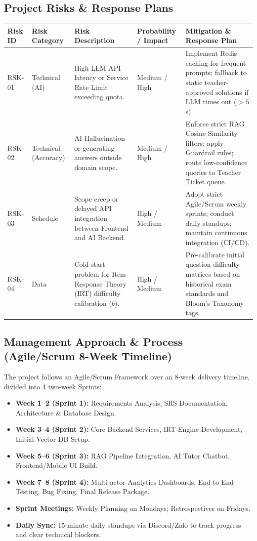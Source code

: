 \documentclass[12pt,a4paper]{article}
\begin{document}
\subsection{Project Risks \& Response Plans}
\begin{table}[H]
\centering
\small
\renewcommand{\arraystretch}{1.3}
\begin{tabularx}{\textwidth}{p{1.4cm} p{2.2cm} X p{2.0cm} X}
\toprule
\textbf{Risk ID} & \textbf{Risk Category} & \textbf{Risk Description} & \textbf{Probability / Impact} & \textbf{Mitigation \& Response Plan} \\
\midrule
RSK-01 & Technical (AI) & High LLM API latency or Service Rate Limit exceeding quota. & Medium / High & Implement Redis caching for frequent prompts; fallback to static teacher-approved solutions if LLM times out ($> 5$s). \\
\addlinespace[0.3em]
RSK-02 & Technical (Accuracy) & AI Hallucination or generating answers outside domain scope. & Medium / High & Enforce strict RAG Cosine Similarity filters; apply Guardrail rules; route low-confidence queries to Teacher Ticket queue. \\
\addlinespace[0.3em]
RSK-03 & Schedule & Scope creep or delayed API integration between Frontend and AI Backend. & High / Medium & Adopt strict Agile/Scrum weekly sprints; conduct daily standups; maintain continuous integration (CI/CD). \\
\addlinespace[0.3em]
RSK-04 & Data & Cold-start problem for Item Response Theory (IRT) difficulty calibration ($b$). & High / Medium & Pre-calibrate initial question difficulty matrices based on historical exam standards and Bloom's Taxonomy tags. \\
\bottomrule
\end{tabularx}
\end{table}

\subsection{Management Approach \& Process (Agile/Scrum 8-Week Timeline)}
The project follows an Agile/Scrum Framework over an 8-week delivery timeline, divided into 4 two-week Sprints:
\begin{itemize}[leftmargin=1.5em, itemsep=0.2em]
    \item \textbf{Week 1--2 (Sprint 1):} Requirements Analysis, SRS Documentation, Architecture \& Database Design.
    \item \textbf{Week 3--4 (Sprint 2):} Core Backend Services, IRT Engine Development, Initial Vector DB Setup.
    \item \textbf{Week 5--6 (Sprint 3):} RAG Pipeline Integration, AI Tutor Chatbot, Frontend/Mobile UI Build.
    \item \textbf{Week 7--8 (Sprint 4):} Multi-actor Analytics Dashboards, End-to-End Testing, Bug Fixing, Final Release Package.
    \item \textbf{Sprint Meetings:} Weekly Planning on Mondays; Retrospectives on Fridays.
    \item \textbf{Daily Sync:} 15-minute daily standups via Discord/Zalo to track progress and clear technical blockers.
\end{itemize}
\end{document}
